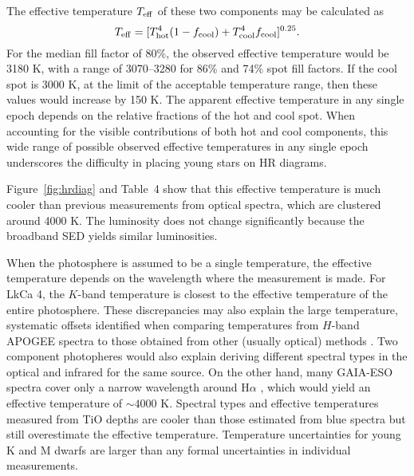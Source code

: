 \documentclass[twocolumn]{emulateapj}%
\begin{document}
The effective temperature $T_{\rm eff}$ of these two components may be calculated as
\begin{equation}
T_{\rm eff}=[T_{\rm hot}^4(1-f_{\mathrm{cool}})+T_{\mathrm{cool}}^4 f_{\mathrm{cool}}]^{0.25}.
\end{equation}
For the median fill factor of 80\%, the observed effective temperature would be 3180 K, with a range of 3070--3280 for 86\% and 74\% spot fill factors.  If the cool spot is 3000 K, at the limit of the acceptable temperature range, then these values would increase by 150 K.  The apparent effective temperature in any single epoch depends on the relative fractions of the hot and cool spot.  When accounting for the visible contributions of both hot and cool components, this wide range of possible observed effective temperatures in any single epoch underscores the difficulty in placing young stars on HR diagrams.  

Figure~\ref{fig:hrdiag} and Table~4 show that this effective temperature is much cooler than previous measurements from optical spectra, which are clustered around 4000 K.  The luminosity does not change significantly because the broadband SED yields similar luminosities.

When the photosphere is assumed to be a single temperature, the effective temperature depends on the wavelength where the measurement is made.  For LkCa 4, the $K$-band temperature is closest to the effective temperature of the entire photosphere.  These discrepancies may also explain the large temperature, systematic offsets identified when comparing temperatures from $H$-band APOGEE spectra to those obtained from other (usually optical) methods \citep{cottaar14}.  Two component photopheres would also explain deriving different spectral types in the optical and infrared for the same source.
On the other hand, many GAIA-ESO spectra cover only a narrow wavelength around H$\alpha$ \citep[e.g.][]{jeffries14,frasca15}, which would yield an effective temperature of $\sim 4000$ K.   Spectral types and effective temperatures measured from TiO depths \citep[e.g.][]{herczeg14} are cooler than those estimated from blue spectra but still overestimate the effective temperature.  Temperature uncertainties for young K and M dwarfs are larger than any formal uncertainties in individual measurements.
\end{document}
